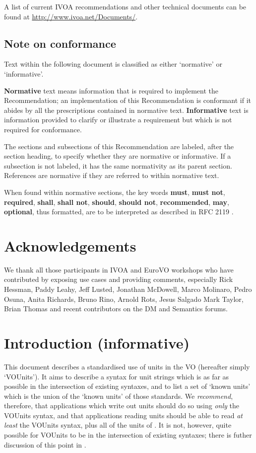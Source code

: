 \documentclass[11pt,notitlepage,onecolumn]{ivoa}
\newcommand*\norm[1]{\textbf{\color{ivoacolor}#1}}
\begin{document}
A list of current IVOA recommendations and other technical documents can be found at
\url{http://www.ivoa.net/Documents/}.

\subsection*{Note on conformance}

Text within the following document is classified as either
`normative' or `informative'.

\textbf{Normative} text means information that is required
to implement the Recommendation; an implementation of this
Recommendation is conformant if it abides by all the prescriptions
contained in normative text.  \textbf{Informative} text is
information provided to clarify or illustrate a requirement but which
is not required for conformance.

The sections and subsections of this Recommendation are labeled,
after the section heading, to specify whether they are normative or
informative.  If a subsection is not labeled, it has the same
normativity as its parent section.  References are normative if they
are referred to within normative text.

When found within normative sections, the key words
\norm{must},
\norm{must not},
\norm{required},
\norm{shall},
\norm{shall not},
\norm{should},
\norm{should not},
\norm{recommended},
\norm{may},
\norm{optional},
thus formatted, are to be interpreted as described in RFC 2119
\citep{std:rfc2119}.

\section*{Acknowledgements}

We thank all those participants in IVOA and EuroVO workshops who have
contributed by exposing use cases and providing comments, especially
Rick Hessman,
Paddy Leahy,
Jeff Lusted,
Jonathan McDowell,
Marco Molinaro,
Pedro Osuna,
Anita Richards,
Bruno Rino,
Arnold Rots,
Jesus Salgado
Mark Taylor,
Brian Thomas
and recent contributors on the DM and Semantics forums.

\section{Introduction (informative)}
\label{sec:intro}

This document describes a standardised use of units in the VO
(hereafter simply `VOUnits').  It aims to describe a syntax for unit
strings which is as far as possible in the intersection of existing
syntaxes, and to list a set of `known units' which is
the union of the `known units' of those standards.
We \emph{recommend}, therefore, that applications which write out
units should do so using \emph{only} the VOUnits syntax, and that
applications reading units should be able to read \emph{at least} the
VOUnits syntax, plus all of the units of .
It is not, however, quite possible for VOUnits to be in the
intersection of existing syntaxes; there is futher discussion of this
point in .
\end{document}
